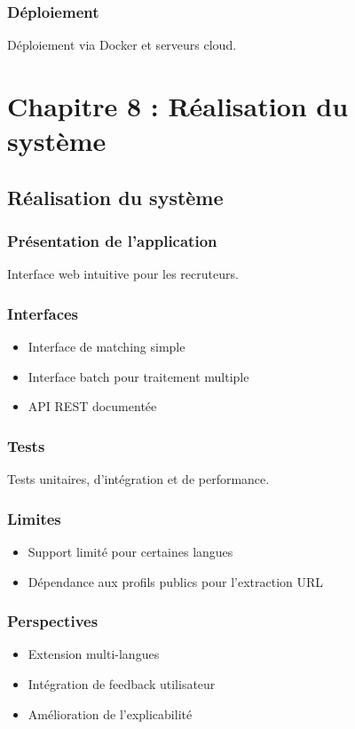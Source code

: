 \documentclass[12pt,a4paper]{report}
\begin{document}
\section{Déploiement}
Déploiement via Docker et serveurs cloud.

\part{Chapitre 8 : Réalisation du système}
\chapter{Réalisation du système}

\section{Présentation de l'application}
Interface web intuitive pour les recruteurs.

\section{Interfaces}
\begin{itemize}
\item Interface de matching simple
\item Interface batch pour traitement multiple
\item API REST documentée
\end{itemize}

\section{Tests}
Tests unitaires, d'intégration et de performance.

\section{Limites}
\begin{itemize}
\item Support limité pour certaines langues
\item Dépendance aux profils publics pour l'extraction URL
\end{itemize}

\section{Perspectives}
\begin{itemize}
\item Extension multi-langues
\item Intégration de feedback utilisateur
\item Amélioration de l'explicabilité
\end{itemize}
\end{document}
